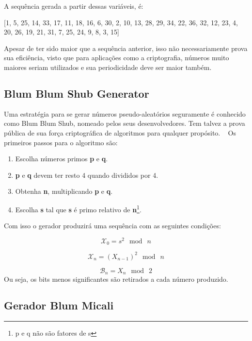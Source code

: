 A sequência gerada a partir dessas variáveis, é:

[1, 5, 25, 14, 33, 17, 11, 18, 16, 6, 30, 2, 10, 13, 28, 29, 34, 22, 36, 32, 12, 23, 4, 20, 26, 19, 21, 31, 7, 25, 24, 9, 8, 3, 15]

Apesar de ter sido maior que a sequência anterior, isso não necessariamente prova sua eficiência, visto que para aplicações como a criptografia, números muito maiores seriam utilizados e sua periodicidade deve ser maior também.


\subsection{Blum Blum Shub Generator}
Uma estratégia para se gerar números pseudo-aleatórios seguramente é conhecido como Blum Blum Shub, nomeado pelos seus desenvolvedores. Tem talvez a prova pública de sua força criptográfica de algoritmos para qualquer propósito. ~\cite{william-stallings} Os primeiros passos para o algoritmo são:

\begin{enumerate}
	\item Escolha números primos \textbf{p} e \textbf{q}.
	\item \textbf{p} e \textbf{q} devem ter resto 4 quando divididos por 4.
	\item Obtenha \textbf{n}, multiplicando \textbf{p} e \textbf{q}.
	\item Escolha \textbf{s} tal que \textbf{s} é primo relativo de \textbf{n}\footnote{p e q não são fatores de s}.
\end{enumerate}

Com isso o gerador produzirá uma sequência com as seguintes condições:

\begin{equation}
	\label{Equação para produzir a sequência}
	\mathcal{X}_0 = s^2\: \bmod \: n
\end{equation}

\begin{equation}
	\label{Equação para produzir a sequência}
	\mathcal{X}_n = (X_{n-1})^2 \: \bmod \: n
\end{equation}

\begin{equation}
	\label{Equação para produzir a sequência}
	\mathcal{B}_n = X_n \: \bmod \: 2
\end{equation}
Ou seja, os bits menos significantes são retirados a cada número produzido.

\subsection{Gerador Blum Micali}
\label{blum-micali-generator}

